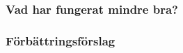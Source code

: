 \documentclass[a4paper]{article}
\begin{document}
\subsubsection{Vad har fungerat mindre bra?}
%
%
%
%
%
%
%
%

\subsubsection{Förbättringsförslag}
%
%
%
%
\end{document}
